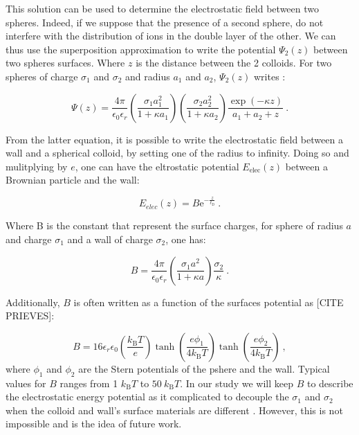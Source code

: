 This solution can be used to determine the  electrostatic field between two spheres. Indeed, if we suppose that the presence of a second sphere, do not interfere with the distribution of ions in the double layer of the other. We can thus use the superposition approximation to write the potential $\Psi _2 (z)$ between two spheres surfaces. Where $z$ is the distance between the 2 colloids. For two spheres of charge $\sigma_1$ and $\sigma_2$ and radius $a_1$ and $a_2$, $\Psi_2 (z)$ writes \cite{bell_approximate_1970}:

\begin{equation}
	\Psi(z) = \frac{4\pi}{\epsilon_0 \epsilon_r} 
	\left(
	\frac{\sigma_1 a_1 ^2}{1 + \kappa a_1}
	\right)
	\left(
	\frac{\sigma_2 a_2 ^2}{1 + \kappa a_2}
	\right)
	\frac{\exp(-\kappa z)}{a_1 + a_2 + z} ~.
\end{equation} 

From the latter equation, it is possible to write the electrostatic field between a wall and a spherical colloid, by setting one of the radius to infinity. Doing so and mulitplying by $e$, one can have the eltrostatic potential $E_\mathrm{elec}(z)$ between a Brownian particle and the wall:

\begin{equation}
	E_{elec} (z) = B \mathrm{e}^{-\frac{z}{\ell_\mathrm{D}}}~.
	\label{Eq:Uelec}
\end{equation}

Where B is the constant that represent the surface charges, for sphere of radius $a$ and charge $\sigma_1$ and a wall of charge $\sigma_2$, one has:

\begin{equation}
	B = \frac{4 \pi}{\epsilon_0 \epsilon_r} \left( \frac{\sigma_1 a^2 }{1 + \kappa a}  \right) \frac{\sigma_2}{\kappa} ~.
\end{equation}

 Additionally, $B$ is often written as a function of the surfaces potential as [CITE PRIEVES]:

\begin{equation}
	B = 16 \epsilon_r \epsilon_0 \left(\frac{k_\mathrm{B}T}{e}\right) \tanh \left(\frac{e\phi_1}{4k_\mathrm{B}T}\right) \tanh \left(\frac{e\phi_2}{4k_\mathrm{B}T}\right) ~,
\end{equation}
 where $\phi_1$ and $\phi_2$ are the Stern potentials of the pshere and the wall. Typical values for $B$ ranges from 1 $k_\mathrm{B}T$ to $50 ~ k_\mathrm{B}T$. In our study we will keep $B$ to describe the electrostatic energy potential as it complicated to decouple the $\sigma_1$ and $\sigma_2$ when the colloid and wall's surface materials are different \cite{behrens_charge_2001}. However, this is not impossible and is the idea of future work.

